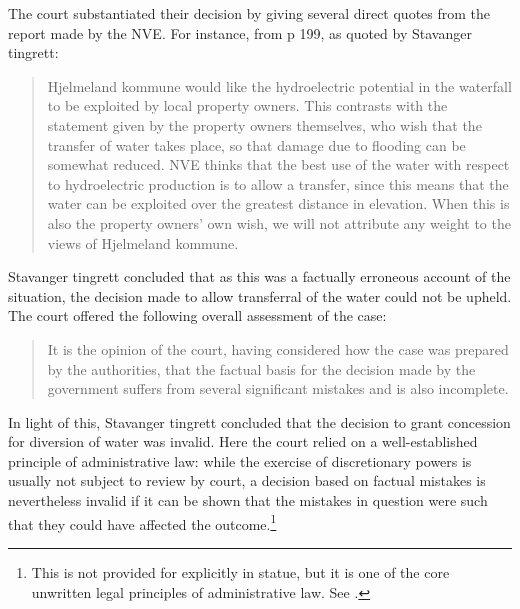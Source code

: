 The court substantiated their decision by giving several direct quotes from the report made by the NVE. For instance, from p 199, as quoted by Stavanger tingrett:
\begin{quote}
Hjelmeland kommune would like the hydroelectric potential in the waterfall to be exploited by 
local property owners. This contrasts with the statement given by the property owners 
themselves, who wish that the transfer of water takes place, so that damage due to flooding can be 
somewhat reduced. NVE thinks that the best use of the water with respect to hydroelectric 
production is to allow a transfer, since this means that the water can be exploited over the greatest
distance in elevation. When this is also the property owners' own wish, we will not attribute any 
weight to the views of Hjelmeland kommune.
\end{quote}

Stavanger tingrett concluded that as this was a factually erroneous account of the situation, the decision made to allow transferral of the water could not be upheld. The court offered the following overall assessment of the case:

\begin{quote}
It is the opinion of the court, having considered how the case was prepared by the authorities, that the factual basis for the decision made by the government suffers from several significant mistakes and is also incomplete.
\end{quote}

In light of this, Stavanger tingrett concluded that the decision to grant concession for diversion of water was invalid. Here the court relied on a well-established principle of administrative law: while the exercise of discretionary powers is usually not subject to review by court, a decision based on factual mistakes is nevertheless invalid if it can be shown that the mistakes in question were such that they could have affected the outcome.\footnote{This is not provided for explicitly in statue, but it is one of the core unwritten legal principles of administrative law. See \cite{eckhoff14}.}

